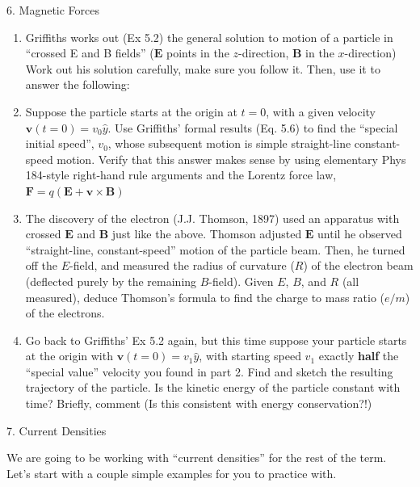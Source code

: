 \documentclass[11pt]{article}
\def\tightlist{}
\begin{document}
{\Large 6. Magnetic Forces}\label{magnetic-forces}

\begin{enumerate}
\def\labelenumi{\arabic{enumi}.}
\tightlist
\item
  Griffiths works out (Ex 5.2) the general solution to motion of a
  particle in ``crossed E and B fields'' (\(\mathbf{E}\) points in the
  \(z\)-direction, \(\mathbf{B}\) in the \(x\)-direction) Work out his
  solution carefully, make sure you follow it. Then, use it to answer
  the following:
\item
  Suppose the particle starts at the origin at \(t=0\), with a given
  velocity \(\mathbf{v}(t=0) = v_0\hat{y}\). Use Griffiths' formal
  results (Eq. 5.6) to find the ``special initial speed'', \(v_0\),
  whose subsequent motion is simple straight-line constant-speed motion.
  Verify that this answer makes sense by using elementary Phys 184-style
  right-hand rule arguments and the Lorentz force law,
  \(\mathbf{F} = q (\mathbf{E} + \mathbf{v} \times \mathbf{B})\)
\item
  The discovery of the electron (J.J. Thomson, 1897) used an apparatus
  with crossed \(\mathbf{E}\) and \(\mathbf{B}\) just like the above.
  Thomson adjusted \(\mathbf{E}\) until he observed ``straight-line,
  constant-speed'' motion of the particle beam. Then, he turned off the
  \(E\)-field, and measured the radius of curvature (\(R\)) of the
  electron beam (deflected purely by the remaining \(B\)-field). Given
  \(E\), \(B\), and \(R\) (all measured), deduce Thomson's formula to
  find the charge to mass ratio (\(e/m\)) of the electrons.
\item
  Go back to Griffiths' Ex 5.2 again, but this time suppose your
  particle starts at the origin with \(\mathbf{v}(t=0) = v_1\hat{y}\),
  with starting speed \(v_1\) exactly \textbf{half} the ``special
  value'' velocity you found in part 2. Find and sketch the resulting
  trajectory of the particle. Is the kinetic energy of the particle
  constant with time? Briefly, comment (Is this consistent with energy
  conservation?!)
\end{enumerate}

{\Large 7. Current Densities}\label{current-densities}

We are going to be working with ``current densities'' for the rest of
the term. Let's start with a couple simple examples for you to practice
with.
\end{document}
